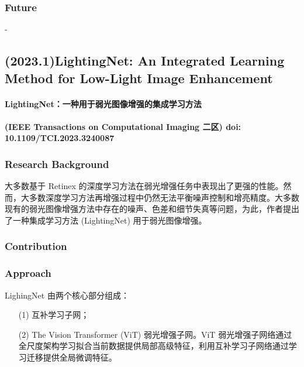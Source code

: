\documentclass[letterpaper,10pt]{article}
\begin{document}
			\subsubsection{Future}
			
			-
			
		\subsection{(2023.1)LightingNet: An Integrated Learning Method for Low-Light Image Enhancement}
		
		\paragraph{LightingNet：一种用于弱光图像增强的集成学习方法}
		
		\paragraph{(IEEE Transactions on Computational Imaging 二区) doi: 10.1109/TCI.2023.3240087}
		
			\subsubsection{Research Background}
			
			大多数基于 Retinex 的深度学习方法在弱光增强任务中表现出了更强的性能。然而，大多数深度学习方法再增强过程中仍然无法平衡噪声控制和增亮精度。大多数现有的弱光图像增强方法中存在的噪声、色差和细节失真等问题，为此，作者提出了一种集成学习方法 (LightingNet) 用于弱光图像增强。
			
			\subsubsection{Contribution}
			
			\subsubsection{Approach}
			
			LighingNet 由两个核心部分组成：
			
			\begin{itemize}
				\item[(1)] 
				互补学习子网；
				
				\item[(2)]
				The Vision Transformer (ViT) 弱光增强子网。ViT 弱光增强子网络通过全尺度架构学习拟合当前数据提供局部高级特征，利用互补学习子网络通过学习迁移提供全局微调特征。
			\end{itemize}	
			
\end{document}
